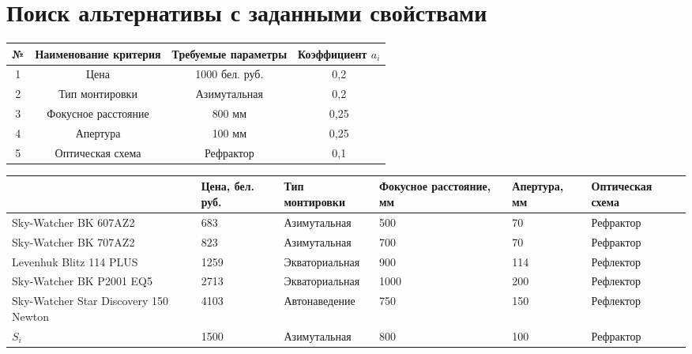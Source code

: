 \section*{Поиск альтернативы с заданными свойствами}

\begin{tabular}{|c|c|c|c|}  
    \hline
    № & \textbf{Наименование критерия} & \textbf{Требуемые параметры} & \textbf{Коэффициент \(a_i\)} \\
    \hline
    1 & Цена & 1000 бел. руб. & 0,2 \\
    \hline
    2 & Тип монтировки & Азимутальная & 0,2 \\
    \hline
    3 & Фокусное расстояние & 800 мм & 0,25 \\
    \hline
    4 & Апертура & 100 мм & 0,25 \\
    \hline
    5 & Оптическая схема & Рефрактор & 0,1 \\
    \hline
\end{tabular}

\begin{tabular}{|m{2cm}|m{2cm}|m{3cm}|m{2cm}|m{2cm}|m{3cm}|}  
    \hline
    & \textbf{Цена, бел. руб.} & \textbf{Тип монтировки} & \textbf{Фокусное расстояние, мм} & \textbf{Апертура, мм} & \textbf{Оптическая схема} \\
    \hline
    Sky-Watcher BK 607AZ2 & 683 & Азимутальная & 500 & 70 & Рефрактор \\
    \hline
    Sky-Watcher BK 707AZ2 & 823 & Азимутальная & 700 & 70 & Рефрактор \\
    \hline
    Levenhuk Blitz 114 PLUS & 1259 & Экваториальная & 900 & 114 & Рефлектор \\
    \hline
    Sky-Watcher BK P2001 EQ5 & 2713 & Экваториальная & 1000 & 200 & Рефлектор \\
    \hline
    Sky-Watcher Star Discovery 150 Newton & 4103 & Автонаведение & 750 & 150 & Рефлектор \\
    \hline
    \(S_i\)	& 1500 & Азимутальная & 800 &100 & Рефрактор \\
    \hline
\end{tabular}
